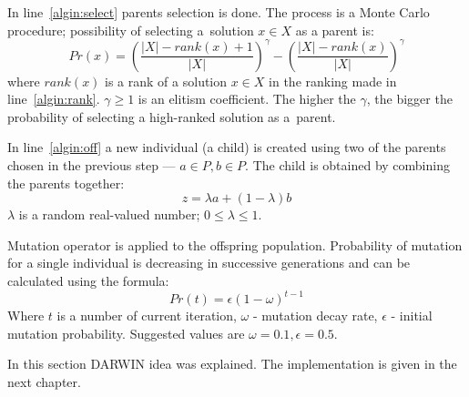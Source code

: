 In line~\ref{algin:select} parents selection is done. The process is a Monte
Carlo procedure; possibility of selecting a~solution $x \in X$ as a parent
is:\\
$$Pr(x) = \left( \frac{|X|-\textit{rank}(x) + 1}{|X|} \right)^\gamma - \left(
\frac{|X|-\textit{rank}(x)}{|X|} \right)^\gamma$$ where $\textit{rank}(x)$ is
a rank of a solution $x \in X$ in the ranking made in
line~\ref{algin:rank}. $\gamma \geq 1$ is an elitism coefficient. The higher
the $\gamma$, the bigger the probability of selecting a high-ranked solution
as a~parent.

In line~\ref{algin:off} a new individual (a child) is created using two of the
parents chosen in the previous step --- $a \in P, b \in P$. The child is
obtained by combining the parents together: $$z = \lambda a + (1 - \lambda)
b$$ $\lambda$ is a random real-valued number; $0 \leq \lambda \leq 1$.


Mutation operator is applied to the offspring population. Probability of
mutation for a single individual is decreasing in successive generations and
can be calculated using the formula: $$Pr(t) = \epsilon (1 - \omega)^{t-1}$$
Where $t$ is a number of current iteration, $\omega$ - mutation decay rate,
$\epsilon$ - initial mutation probability. Suggested values are
$\omega = 0.1, \epsilon = 0.5$.

In this section DARWIN idea was explained. The implementation is given in the
next chapter.

